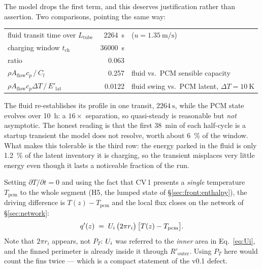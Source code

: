The model drops the first term, and this deserves justification rather than
assertion. Two comparisons, pointing the same way:

\begin{center}
\begin{tabular}{@{}l r l@{}}
\toprule
fluid transit time over $L_{\mathrm{tube}}$ & \SI{2264}{\second} & ($u=\SI{1.35}{\meter\per\second}$) \\
charging window $t_{\mathrm{ch}}$           & \SI{36000}{\second} & \\
\midrule
ratio                                        & \num{0.063} & \\
$\rho A_{\mathrm{flow}}c_{p} \,/\, C_{l}$    & \num{0.257} & fluid vs.\ PCM sensible capacity \\
$\rho A_{\mathrm{flow}}c_{p}\Delta T \,/\, E'_{\mathrm{lat}}$
   & \num{0.0122} & fluid swing vs.\ PCM latent, $\Delta T=\SI{10}{\kelvin}$ \\
\bottomrule
\end{tabular}
\end{center}

\noindent
The fluid re-establishes its profile in one transit, $\SI{2264}{\second}$,
while the PCM state evolves over \SI{10}{\hour}: a $16\times$ separation, so
quasi-steady is reasonable but \emph{not} asymptotic. The honest reading is
that the first \SI{38}{\minute} of each half-cycle is a startup transient the
model does not resolve, worth about \SI{6}{\percent} of the window. What makes
this tolerable is the third row: the energy parked in the fluid is only
\SI{1.2}{\percent} of the latent inventory it is charging, so the transient
misplaces very little energy even though it lasts a noticeable fraction of the
run.

Setting $\partial T/\partial t = 0$ and using the fact that CV\,1 presents a
\emph{single} temperature $T_{\mathrm{pcm}}$ to the whole segment
(H5, the lumped state of \S\ref{sec:front:enthalpy}), the driving difference is
$T(z)-T_{\mathrm{pcm}}$ and the local flux closes on the network of
\S\ref{sec:network}:
\begin{equation}
  q'(z) \;=\; U_{i}\,\bigl(2\pi r_{i}\bigr)\,\bigl[T(z)-T_{\mathrm{pcm}}\bigr].
  \label{eq:local-flux}
\end{equation}
Note that $2\pi r_{i}$ appears, not $P_{T}$: $U_{i}$ was referred to the
\emph{inner} area in Eq.~\eqref{eq:Ui}, and the finned perimeter is already
inside it through $R'_{\mathrm{outer}}$. Using $P_{T}$ here would count the fins
twice --- which is a compact statement of the v0.1 defect.


